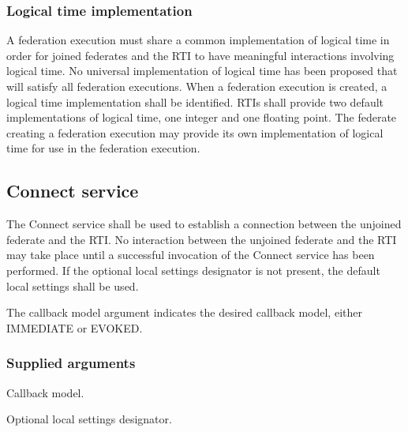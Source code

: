 \subsubsection{Logical time implementation}

A federation execution must share a common implementation of logical time in order for joined federates and the RTI to have meaningful interactions involving logical time. No universal implementation of logical time has been proposed that will satisfy all federation executions. When a federation execution is created, a logical time implementation shall be identified. RTIs shall provide two default implementations of logical time, one integer and one floating point. The federate creating a federation execution may provide its own implementation of logical time for use in the federation execution.

\subsection{Connect service}

The Connect service shall be used to establish a connection between the unjoined federate and the RTI. No interaction between the unjoined federate and the RTI may take place until a successful invocation of the Connect service has been performed. If the optional local settings designator is not present, the default local settings shall be used.

The callback model argument indicates the desired callback model, either IMMEDIATE or EVOKED.

\subsubsection{Supplied arguments}

\begin{stdalphalist}
    \item Callback model.
    \item Optional local settings designator.
\end{stdalphalist}

\clearpage

